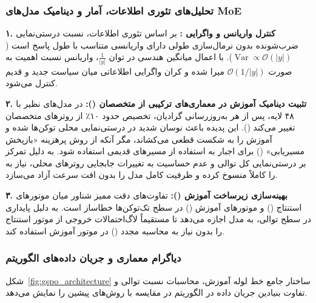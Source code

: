 \subsubsection*{تحلیل‌های تئوری اطلاعات، آمار و دینامیک مدل‌های MoE}

\textbf{۱. کنترل واریانس و واگرایی :}
بر اساس تئوری اطلاعات، نسبت درستی‌نمایی ضرب‌شونده بدون نرمال‌سازی طولی دارای واریانسی متناسب با طول پاسخ است ($\operatorname{Var} \propto \mathcal{O}(|y|)$). با اعمال میانگین هندسی در توان $\frac{1}{|y|}$، واریانس نسبت اهمیت به صورت $\mathcal{O}(1/|y|)$ میرا شده و کران واگرایی اطلاعاتی میان سیاست جدید و قدیم کنترل می‌شود.

\textbf{۲. تثبیت دینامیک آموزش در معماری‌های ترکیبی از متخصصان ():}
در مدل‌های  نظیر  با ۴۸ لایه، پس از هر به‌روزرسانی گرادیان، تخصیص حدود ۱۰٪ از روترهای متخصصان تغییر می‌کند (). این پدیده باعث نوسان شدید در درستی‌نمایی محلی توکن‌ها شده و آموزش  را به شکست قطعی می‌کشاند، مگر آنکه از روش پرهزینه «بازپخش مسیریابی» () برای اجبار به استفاده از مسیرهای قدیمی استفاده شود.  به دلیل تمرکز بر درستی‌نمایی کل توالی و عدم حساسیت به تغییرات جابجایی روترهای محلی، نیاز به  را کاملاً منسوخ کرده و ظرفیت کامل مدل را بدون افت سرعت آزاد می‌سازد.

\textbf{۳. بهینه‌سازی زیرساخت آموزش ():}
تفاوت‌های دقت ممیز شناور میان موتورهای استنتاج () و موتورهای آموزش () در سطح تک‌توکن‌ها خطاساز است.  به دلیل پایداری در سطح توالی، به مدل اجازه می‌دهد تا مستقیماً لاگ‌احتمالات خروجی از موتور استنتاج را بدون نیاز به محاسبه مجدد () در موتور آموزش استفاده کند.

\subsubsection*{دیاگرام معماری و جریان داده‌های الگوریتم}

شکل~\ref{fig:gspo_architecture} ساختار جامع خط لوله آموزش، محاسبات نسبت توالی و تفاوت بنیادین جریان داده در الگوریتم  در مقایسه با روش‌های پیشین را نمایش می‌دهد.

